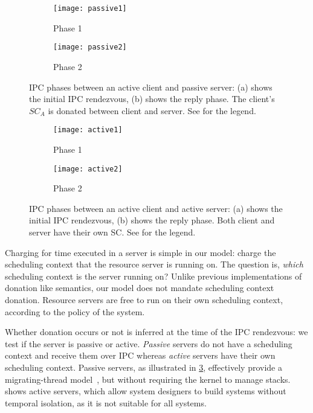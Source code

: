 \begin{figure}
    \centering
    \begin{subfigure}[h]{0.48\textwidth}
        \centering
        \texttt{[image: passive1]}
        \caption{Phase 1}
        \label{f:passive1}
    \end{subfigure}%
    \begin{subfigure}[h]{0.48\textwidth}
        \centering
        \texttt{[image: passive2]}
        \caption{Phase 2}
        \label{f:passive2}
    \end{subfigure}
    \caption[IPC phases between an active client and passive server.]{IPC phases between an active client and passive server: (a) shows the initial IPC rendezvous, (b) shows the
    reply phase. The client's $SC_{A}$ is donated between client and server. See  for the legend.}
    \label{f:passive}
\end{figure}
\begin{figure}
\centering
\begin{subfigure}[h]{0.48\textwidth}
    \centering
    \texttt{[image: active1]}
    \caption{Phase 1}
    \label{f:active1}
\end{subfigure}%
\begin{subfigure}[h]{0.48\textwidth}
    \centering
    \texttt{[image: active2]}
    \caption{Phase 2}
    \label{f:active2}
\end{subfigure}
\caption[IPC phases between active client and active server.]{IPC phases between an active client and active server: (a) shows the initial IPC rendezvous, (b) shows the
reply phase. Both client and server have their own SC. See  for the legend.}
\label{f:active}
\end{figure}

Charging for time executed in a server is simple in our model: charge the scheduling
context that the resource server is running on.
The question is, \emph{which} scheduling context is the server running on? Unlike
previous implementations of donation like semantics, our model does not mandate
scheduling context donation. Resource servers are free to run on their own scheduling context, 
according to the policy of the system.

Whether donation occurs or not is inferred at the time of the IPC rendezvous: we test if the
server is passive or active. 
\emph{Passive} servers do not have a scheduling context 
and receive them over \gls{IPC} whereas \emph{active} servers have their own scheduling context. 
Passive servers, as illustrated in \cref{f:passive}, effectively provide a migrating-thread
model~\citep{Ford_Lepreau_94, Gabber_SBBS_99}, but without requiring
the kernel to manage stacks.  shows active servers, which allow system designers to
build systems without temporal isolation, as it is not suitable
for all systems.

